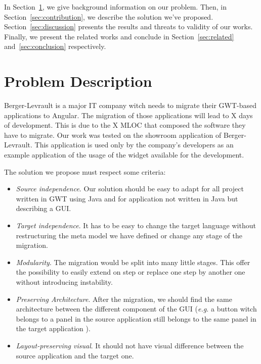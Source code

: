 \documentclass[conference]{IEEEtran}
\begin{document}

In Section~\ref{sec:problem}, we give background information on our problem. 
Then, in Section~\ref{sec:contribution}, we describe the solution we've proposed.
Section~\ref{sec:discussion} presents the results and threats to validity of our works.
Finally, we present the related works and conclude in Section~\ref{sec:related} and~\ref{sec:conclusion} respectively.

\section{Problem Description}
\label{sec:problem}


Berger-Levrault is a major IT company witch needs to migrate
    their GWT-based applications to Angular.
The migration of those applications will lead to X days of development.
This is due to the X MLOC that composed the software they have to migrate.
Our work was tested on the showroom application of Berger-Levrault. 
This application is used only by the company's developers as
    an example application of the usage of the widget available for the development.




The solution we propose must respect some criteria:
\begin{itemize}
    \item \emph{Source independence}. Our solution should be easy to adapt
        for all project written in GWT using Java and for
        application not written in Java but describing a GUI.
    \item \emph{Target independence}. It has to be easy to change the target
        language without restructuring the meta model we have defined or 
        change any stage of the migration.
    \item \emph{Modularity}. The migration would be split into many little
        stages. This offer the possibility to easily extend on step or 
        replace one step by another one without introducing instability. 
    \item \emph{Preserving Architecture}. After the migration, we should find
        the same architecture between the different component of the GUI (\emph{e.g.}
        a button witch belongs to a panel in the source application still belongs to the same panel in the target application ).
    \item \emph{Layout-preserving visual}. It should not have visual difference
        between the source application and the target one.
\end{itemize}
\end{document}

